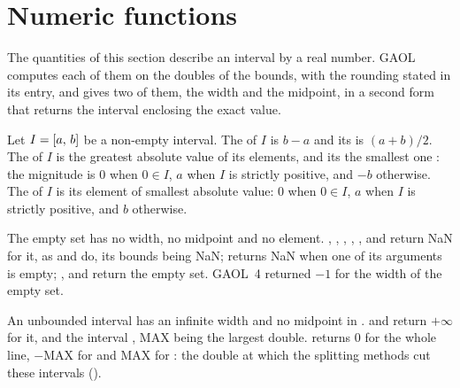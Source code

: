 \section{Numeric functions}\label{sec:functions-numeric}
%
%
%

The quantities of this section describe an interval by a real number. GAOL
computes each of them on the doubles of the bounds, with the rounding stated
in its entry, and gives two of them, the width and the midpoint, in a second
form that returns the interval enclosing the exact value.

\begin{Def}\label{def:functions-numeric}
Let $I=[a,\,b]$ be a non-empty interval. The  of $I$ is $b-a$
and its  is $(a+b)/2$. The  of $I$ is the
greatest absolute value of its elements, and its  the
smallest one \cite[chap.~3]{Hansen:book92}: the mignitude is $0$ when
$0\in I$, $a$ when $I$ is strictly positive, and $-b$ otherwise. The
 of $I$ \cite[def.~1.3.28]{Stahl:PhD} is its element
of smallest absolute value: $0$ when $0\in I$, $a$ when $I$ is strictly
positive, and $b$ otherwise.
\end{Def}

\begin{Rem}\label{rem:functions-empty}
The empty set has no width, no midpoint and no element. ,
, , , ,
 and  return NaN for it, as  and
 do, its bounds being NaN;  returns NaN
when one of its arguments is empty; ,
 and  return the empty set. GAOL~4 returned
$-1$ for the width of the empty set.\newinvfive
\end{Rem}

\begin{Rem}\label{rem:functions-unbounded}
An unbounded interval has an infinite width and no midpoint in \RSet.
 and  return $+\infty$ for it, and
 the interval , MAX being
the largest double.  returns $0$ for the whole line,
$-\text{MAX}$ for  and MAX for : the double
at which the splitting methods cut these intervals ().
\end{Rem}

